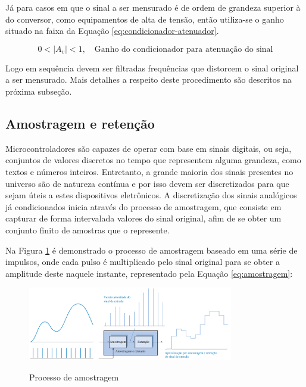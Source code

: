 \documentclass[oneside,openright,12pt]{ufsm_2015} %
\begin{document}
Já para casos em que o sinal a ser mensurado é de ordem de grandeza superior à do conversor, como equipamentos de alta de tensão, então utiliza-se o ganho situado na faixa da Equação \ref{eq:condicionador-atenuador}.

\begin{equation}\label{eq:condicionador-atenuador}
    0 < |A_{v}| < 1,\quad \text{Ganho do condicionador para atenuação do sinal}    
\end{equation}

Logo em sequência devem ser filtradas frequências que distorcem o sinal original a ser mensurado. Mais detalhes a respeito deste procedimento são descritos na próxima subseção.

\subsection{Amostragem e retenção}
Microcontroladores são capazes de operar com base em sinais digitais, ou seja, conjuntos de valores discretos no tempo que representem alguma grandeza, como textos e números inteiros. Entretanto, a grande maioria dos sinais presentes no universo são de natureza contínua e por isso devem ser discretizados para que sejam úteis a estes dispositivos eletrônicos. A discretização dos sinais analógicos já condicionados inicia através do processo de amostragem, que consiste em capturar de forma intervalada valores do sinal original, afim de se obter um conjunto finito de amostras que o represente.

Na Figura \ref{fig:processo-de-amostragem} é demonstrado o processo de amostragem baseado em uma série de impulsos, onde cada pulso é multiplicado pelo sinal original para se obter a amplitude deste naquele instante, representado pela Equação \ref{eq:amostragem}: 

\begin{figure}[ht]
    \caption{\label{exepretex} Processo de amostragem}
    \centering
    \includegraphics[width=0.8\textwidth]{figuras/sample-and-hold.png}
    \vspace{\baselineskip} %
        \label{fig:processo-de-amostragem}
\end{figure}
\end{document}
